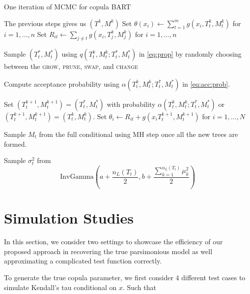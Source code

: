 \documentclass{amsart}
\begin{document}
\begin{algorithm}
	\caption{One iteration of MCMC for copula BART}\label{alg:MCMC}
	\begin{algorithmic}[1]
		\State The previous steps gives us $(T^k,M^k)$
		\State Set $\theta(x_i) \leftarrow \sum_{t=1}^{m} g(x_i, T^k_t, M^k_t)$ for $i = 1, \ldots, n$
		\State Set $R_{it} \leftarrow \sum_{j\not=t}g(x_i, T_j^k, M_j^k)$ for $i = 1, \ldots, n$
		
		\State Sample $(T_t^\ast, M_t^\ast)$ using $q\left(T_t^k,M_t^k;T_t^\ast, M_t^\ast\right)$ in \cref{eq:prop} by randomly choosing between the \textsc{grow}, \textsc{prune}, \textsc{swap}, and \textsc{change} 
		
		\State Compute acceptance probability using $\alpha\left(T_t^k,M_t^k;T_t^\ast, M_t^\ast\right)$ in \cref{eq:acc:prob}.
		
		\State Set $(T_t^{k+1}, M_t^{k+1})=(T_t^\ast, M_t^\ast)$ with probability $\alpha\left(T_t^k,M_t^k;T_t^\ast, M_t^\ast\right)$ or $(T_t^{k+1}, M_t^{k+1})=(T_t^k,M_t^k)$.
		\State Set $\theta_i \leftarrow R_{it} + g(x_i T_t^{k+1}, M_t^{k+1})$ for $i = 1, \ldots, N$
		
		\State Sample $M_t$ from the full conditional using MH step once all the new trees are formed.
		
		\State Sample $\sigma_{t}^2$ from 
		\begin{equation*}
			\text{InvGamma}\left(a+\frac{n_L(T_t)}{2} , b + \frac{\sum_{k=1}^{n_L(T_t)}\mu_k^2}{2}\right)
		\end{equation*}
		\EndFor
	\end{algorithmic}
\end{algorithm}

\section{Simulation Studies}\label{sec:sim}

In this section, we consider two settings to showcase the efficiency of our proposed approach in recovering the true parsimonious model as well approximating a complicated test function correctly. 

To generate the true copula parameter, we first consider 4 different test cases to simulate Kendall's tau conditional on $x$. Such that
\end{document}
